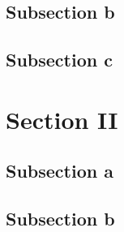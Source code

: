 \documentclass[aspectratio=169, 10pt]{beamer}
\theoremstyle{definition}
\begin{document}
\subsection{Subsection b}
\subsection{Subsection c}
\section{Section II}
\subsection{Subsection a}
\subsection{Subsection b}
\end{document}
